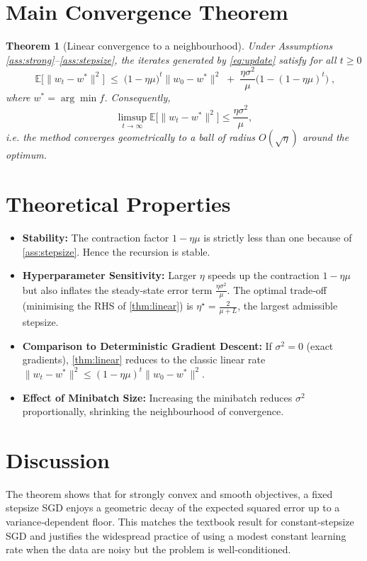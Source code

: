 \documentclass[11pt]{article}
\newtheorem{theorem}{Theorem}
\newcommand{\E}{\mathbb{E}}
\begin{document}
\section*{Main Convergence Theorem}
\begin{theorem}[Linear convergence to a neighbourhood]\label{thm:linear}
Under Assumptions \ref{ass:strong}–\ref{ass:stepsize}, the iterates generated by \eqref{eq:update} satisfy for all $t\ge0$
\[
\boxed{\;
\E\!\big[\|w_{t}-w^{*}\|^{2}\big]\;\le\;\big(1-\eta\mu\big)^{t}\|w_{0}-w^{*}\|^{2}
\;+\;\frac{\eta\sigma^{2}}{\mu}\big(1-(1-\eta\mu)^{t}\big)\;},
\tag{1}
\]
where $w^{*}=\arg\min f$.
Consequently,
\[
\limsup_{t\to\infty}\E\!\big[\|w_{t}-w^{*}\|^{2}\big]\le\frac{\eta\sigma^{2}}{\mu},
\]
i.e. the method converges geometrically to a ball of radius $O(\sqrt{\eta})$ around the optimum.
\end{theorem}

\section*{Theoretical Properties}
\begin{itemize}
\item \textbf{Stability:} The contraction factor $1-\eta\mu$ is strictly less than one because of \eqref{ass:stepsize}. Hence the recursion is stable.
\item \textbf{Hyperparameter Sensitivity:} Larger $\eta$ speeds up the contraction $1-\eta\mu$ but also inflates the steady‑state error term $\frac{\eta\sigma^{2}}{\mu}$. The optimal trade‑off (minimising the RHS of \eqref{thm:linear}) is $\eta^{\star}= \frac{2}{\mu+L}$, the largest admissible stepsize.
\item \textbf{Comparison to Deterministic Gradient Descent:} If $\sigma^{2}=0$ (exact gradients), \eqref{thm:linear} reduces to the classic linear rate $\|w_{t}-w^{*}\|^{2}\le(1-\eta\mu)^{t}\|w_{0}-w^{*}\|^{2}$.
\item \textbf{Effect of Minibatch Size:} Increasing the minibatch reduces $\sigma^{2}$ proportionally, shrinking the neighbourhood of convergence.
\end{itemize}

\section*{Discussion}
The theorem shows that for strongly convex and smooth objectives, a fixed stepsize SGD enjoys a geometric decay of the expected squared error up to a variance‑dependent floor. This matches the textbook result for constant‑stepsize SGD and justifies the widespread practice of using a modest constant learning rate when the data are noisy but the problem is well‑conditioned.
\end{document}
